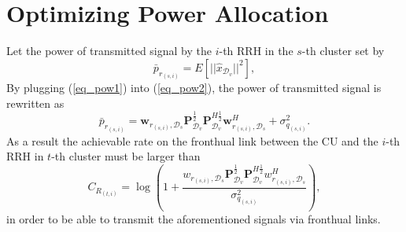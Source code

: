 \documentclass[conference,10pt,twocolumn,letter]{IEEEtran}
\begin{document}
\section{Optimizing Power Allocation}
Let the power of transmitted signal by the $i$-th RRH in the $s$-th cluster set by
\begin{equation} \label{eq_pow2}
\bar{p}_{r_{(s,i)}} = \mathit{E}[|| \hat{x}_{\mathcal{D}_v} ||^2],
\end{equation}
By plugging (\ref{eq_pow1}) into (\ref{eq_pow2}), the power of transmitted signal is rewritten as
\begin{equation}
\bar{p}_{r_{(s,i)}} = \boldsymbol{w}_{r_{(s,i)},\mathcal{D}_{s}} \boldsymbol{P}_{\mathcal{D}_v}^{\frac{1}{2}} \boldsymbol{P}_{\mathcal{D}_v}^{H \frac{1}{2}}   \boldsymbol{w}_{r_{(s,i)},\mathcal{D}_{s}}^H + \sigma_{q_{(s,i)}}^2.
\end{equation}
As a result the achievable rate on the fronthual link between the CU and the $i$-th RRH in $t$-th cluster must be larger than
\begin{equation}
C_{R_{(t,i)}} = \log{(1+\frac{w_{r_{(s,i)},\mathcal{D}_{s}} \boldsymbol{P}_{\mathcal{D}_v}^{\frac{1}{2}} \boldsymbol{P}_{\mathcal{D}_v}^{H \frac{1}{2}}   w_{r_{(s,i)},\mathcal{D}_{s}}^H }{ \sigma_{q_{(s,i)}}^2})},
\end{equation}
in order to be able to transmit the aforementioned signals via fronthual links.
\end{document}
